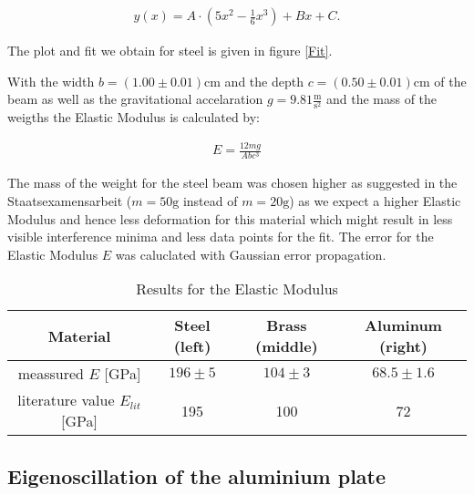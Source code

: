 \begin{align*}
y(x)=A\cdot\left(5x^2-\frac{1}{6}x^3\right)+Bx+C .
\end{align*}  

The plot and fit we obtain for steel is given in figure \ref{Fit}.



With the width  $b=(1.00\pm0.01)\mathrm{cm}$ and the depth  $c=(0.50\pm0.01)\mathrm{cm}$ of the beam as well as the gravitational accelaration $g=9.81\frac{\mathrm{m}}{\mathrm{s}^2}$ and the mass of the weigths the Elastic Modulus is calculated by: 

\begin{align}
E=\frac{12mg}{Abc^3}
\end{align}

The mass of the weight for the steel beam was chosen higher as suggested in the Staatsexamensarbeit \cite{staats} ($m=50\mathrm{g}$ instead of $m=20\mathrm{g}$) as we expect a higher Elastic Modulus and hence less deformation for this material  which might result in less visible interference minima and less data points for the fit.
The error for the Elastic Modulus $E$ was caluclated with Gaussian error propagation.

\begin{table}[h!]
	\centering
	\begin{tabular}{c|c|c|c}
		Material							& Steel (left)	& Brass (middle)	& Aluminum (right)\\ \hline\hline
		meassured $E$ [GPa]			& $196\pm5$	& 	$104\pm3$		& $68.5\pm1.6$			\\ \hline
	literature value \cite{staats} $E_{lit}$ [GPa]	& 195			& 100				& 72
	\end{tabular}
	\caption{Results for the Elastic Modulus}
\end{table}

\subsection{Eigenoscillation of the aluminium plate}

